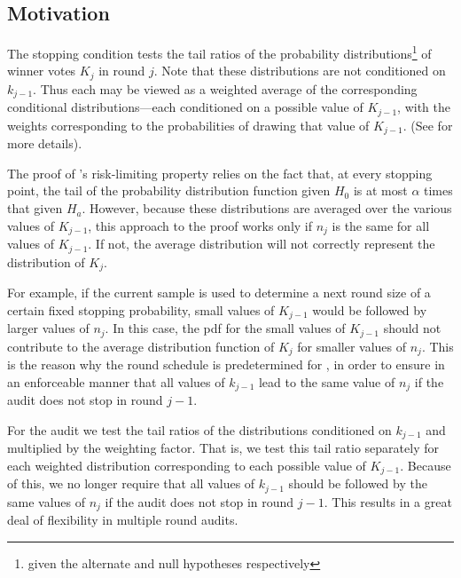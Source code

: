 \subsection{Motivation}
\label{sec:prov_motivation}
The \Minerva stopping condition tests the tail ratios of the probability distributions\footnote{given the alternate and null hypotheses respectively} of winner votes $K_j$ in round $j$. Note that these distributions are not conditioned on $k_{j-1}$. Thus each may be viewed as a weighted average of the corresponding conditional distributions---each conditioned on a possible value of $K_{j-1}$, with the weights corresponding to the probabilities of drawing that value of $K_{j-1}$. (See \cite{usenix_minerva} for more details). 

The proof of \Minerva's risk-limiting property relies on the fact that, at every stopping point, the tail of the probability distribution function given $H_0$ is at most $\alpha$ times that given $H_a$. However, because these distributions are averaged over the various values of $K_{j-1}$, this approach to the proof works only if $n_j$ is the same for all values of $K_{j-1}$. If not, the average distribution will not correctly represent the distribution of $K_j$. 

For example, if the current sample is used to determine a next round size of a certain fixed stopping probability, small values of $K_{j-1}$ would be followed by larger values of $n_j$.  In this case, the pdf for the small values of $K_{j-1}$ should not contribute to the average distribution function of $K_j$ for smaller values of $n_j$. This is the reason why the round schedule is predetermined for \Minerva, in order to ensure in an enforceable manner that all values of $k_{j-1}$ lead to the same value of $n_j$ if the audit does not stop in round $j-1$. 

For the \Providence audit we test the tail ratios of the distributions conditioned on $k_{j-1}$ and multiplied by the weighting factor. That is, we test this tail ratio separately for each weighted distribution corresponding to each possible value of $K_{j-1}$. Because of this, we no longer require that all values of $k_{j-1}$ should be followed by the same values of $n_j$ if the audit does not stop in round $j-1$. This results in a great deal of flexibility in multiple round audits. 

